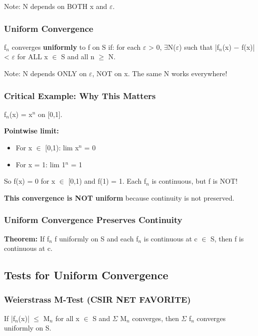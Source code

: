 \documentclass[12pt,a4paper,openany]{book}
\begin{document}
{{Note: N depends on BOTH x and $\varepsilon$.

\subsubsection{Uniform Convergence }
{f$_n$} converges \textbf{uniformly} to f on S if: for each $\varepsilon$ > 0, $\exists$N($\varepsilon$) such that |f$_n$(x) − f(x)| < $\varepsilon$ for ALL x $\in$ S and all n $\geq$ N.

Note: N depends ONLY on $\varepsilon$, NOT on x. The same N works everywhere!

\subsubsection{Critical Example: Why This Matters}
f$_n$(x) = x$^n$ on [0,1].

\textbf{Pointwise limit:}
\begin{itemize}[leftmargin=*]
  \item For x $\in$ [0,1): lim x$^n$ = 0
  \item For x = 1: lim 1$^n$ = 1
\end{itemize}

So f(x) = 0 for x $\in$ [0,1) and f(1) = 1. Each f$_n$ is continuous, but f is NOT!

\textbf{This convergence is NOT uniform} because continuity is not preserved.

\subsubsection{Uniform Convergence Preserves Continuity}
\begin{tcolorbox}[colback=lightblue,colframe=thmblue,title=\textbf{Theorem},breakable,boxrule=1.5pt]
\textbf{Theorem:} If f$_n$  f uniformly on S and each f$_n$ is continuous at c $\in$ S, then f is continuous at c.
\end{tcolorbox}

\subsection{Tests for Uniform Convergence}

\subsubsection{Weierstrass M-Test  (CSIR NET FAVORITE)}
If |f$_n$(x)| $\leq$ M$_n$ for all x $\in$ S and $\Sigma$ M$_n$ converges, then $\Sigma$ f$_n$ converges uniformly on S.

}}
\end{document}
